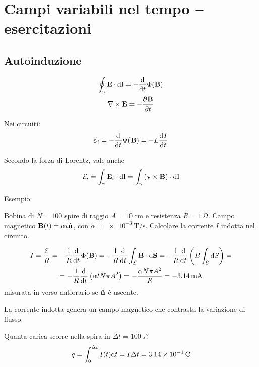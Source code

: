 \chapter[Campi variabili nel tempo -- es.]{Campi variabili nel tempo -- esercitazioni}

\section{Autoinduzione}

\begin{subequations}
\begin{gather}
    \oint_\gamma \E \lde = - \der{t} \Phi(\B) \\
    \curl \E = - \parder[\B]{t}
\end{gather}
\end{subequations}

Nei circuiti:
\begin{equation}
    \fem_i = - \der{t} \Phi(\B) = - L \der[I]{t}
\end{equation}

Secondo la forza di Lorentz, vale anche
\begin{equation}
    \mathcal{E}_i = \int_\gamma \mathbf{E}_i \cdot \mathrm{d} \mathbf{l}
    = \int_\gamma \left( \mathbf{v} \times \mathbf{B} \right) \cdot \mathrm{d} \mathbf{l}
\end{equation}

Esempio:

Bobina di $N = 100$ spire di raggio $A = \qty{10}{\centi\metre}$ e resistenza $R = \qty{1}{\ohm}$.
Campo magnetico $\mathbf{B}(t) = \alpha t \hat{\mathbf{n}}$, con $\alpha = \qty{e-3}{\tesla\per\second}$.
Calcolare la corrente $I$ indotta nel circuito.

\begin{equation}
\begin{gathered}
    I = \frac{\fem}{R}
    = - \frac{1}{R} \der{t} \Phi(\B)
    = - \frac{1}{R} \der{t} \int_S \B \sde
    = - \frac{1}{R} \der{t}\pts{B \int_S \de S} = \\
    = - \frac{1}{R} \der{t}\pts{\alpha t N \pi A^2}
    = - \frac{\alpha N \pi A^2}{R}
    = -\qty{3.14}{\milli\ampere}
\end{gathered}
\end{equation}
misurata in verso antiorario se $\hat{\mathbf{n}}$ è uscente.

La corrente indotta genera un campo magnetico che contrasta la variazione di flusso.

Quanta carica scorre nella spira in $\Delta t = \qty{100}{\second}$?
\begin{equation}
    q = \int_{0}^{\Delta t} I(t) \mathrm{d} t = I \Delta t = \qty{3.14e-1}{\coulomb}
\end{equation}

